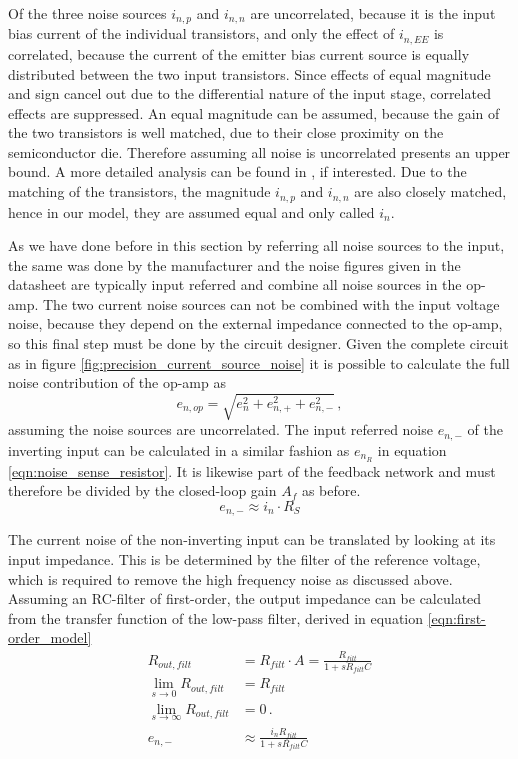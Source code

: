 Of the three noise sources $i_{n,p}$ and $i_{n,n}$ are uncorrelated, because it is the input bias current of the individual transistors, and only the effect of $i_{n,EE}$ is correlated, because the current of the emitter bias current source is equally distributed between the two input transistors. Since effects of equal magnitude and sign cancel out due to the differential nature of the input stage, correlated effects are suppressed. An equal magnitude can be assumed, because the gain of the two transistors is well matched, due to their close proximity on the semiconductor die. Therefore assuming all noise is uncorrelated presents an upper bound. A more detailed analysis can be found in \cite{op-amp_noise_correlation}, if interested. Due to the matching of the transistors, the magnitude $i_{n,p}$ and $i_{n,n}$ are also closely matched, hence in our model, they are assumed equal and only called $i_n$.

As we have done before in this section by referring all noise sources to the input, the same was done by the manufacturer and the noise figures given in the datasheet are typically input referred and combine all noise sources in the op-amp. The two current noise sources can not be combined with the input voltage noise, because they depend on the external impedance connected to the op-amp, so this final step must be done by the circuit designer. Given the complete circuit as in figure \ref{fig:precision_current_source_noise} it is possible to calculate the full noise contribution of the op-amp as
\begin{equation}
    e_{n,op} = \sqrt{e_n^2 + e_{n,+}^2 + e_{n,-}^2}\,,
\end{equation}
assuming the noise sources are uncorrelated. The input referred noise $e_{n,-}$ of the inverting input can be calculated in a similar fashion as $e_{n_R}$ in equation \ref{eqn:noise_sense_resistor}. It is likewise part of the feedback network and must therefore be divided by the closed-loop gain $A_f$ as before.
\begin{equation}
    e_{n,-} \approx i_n \cdot R_S
\end{equation}

The current noise of the non-inverting input can be translated by looking at its input impedance. This is be determined by the filter of the reference voltage, which is required to remove the high frequency noise as discussed above. Assuming an RC-filter of first-order,
the output impedance can be calculated from the transfer function of the low-pass filter, derived in equation \ref{eqn:first-order_model}
\begin{align}
    R_{out,filt} &= R_{filt} \cdot A = \frac{R_{filt}}{1+sR_{filt}C}  \label{eqn:output_impedance_rc_filter}\\
    \lim_{s \to 0} R_{out,filt} &= R_{filt} \nonumber\\
    \lim_{s \to \infty} R_{out,filt} &= 0 \,.\nonumber\\
     e_{n,-} &\approx \frac{i_n R_{filt}}{1+sR_{filt}C}
\end{align}

